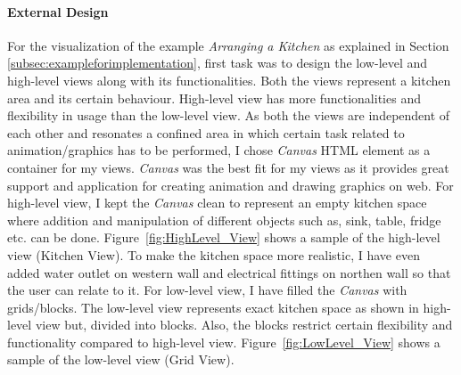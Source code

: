 \paragraph{External Design}
For the visualization of the example \textit{Arranging a Kitchen} as explained in Section \ref{subsec:exampleforimplementation}, first task was to design the low-level and high-level views along with its functionalities.
\newline\newline Both the views represent a kitchen area and its certain behaviour. High-level view has more functionalities and flexibility in usage than the low-level view. As both the views are independent of each other and resonates a confined area in which certain task related to animation/graphics has to be performed, I chose \textit{Canvas} \cite{canvas} HTML element as a container for my views. \textit{Canvas} was the best fit for my views as it provides great support and application for creating animation and drawing graphics on web.
\newline\newline For high-level view, I kept the \textit{Canvas} clean to represent an empty kitchen space where addition and manipulation of different objects such as, sink, table, fridge etc. can be done. Figure~\ref{fig:HighLevel_View} shows a sample of the high-level view (Kitchen View). To make the kitchen space more realistic, I have even added {\color{blue} water outlet} on western wall and {\color{red} electrical fittings} on northen wall so that the user can relate to it. For low-level view, I have filled the \textit{Canvas} with grids/blocks. The low-level view represents exact kitchen space as shown in high-level view but, divided into blocks. Also, the blocks restrict certain flexibility and functionality compared to high-level view. Figure~\ref{fig:LowLevel_View} shows a sample of the low-level view (Grid View).
